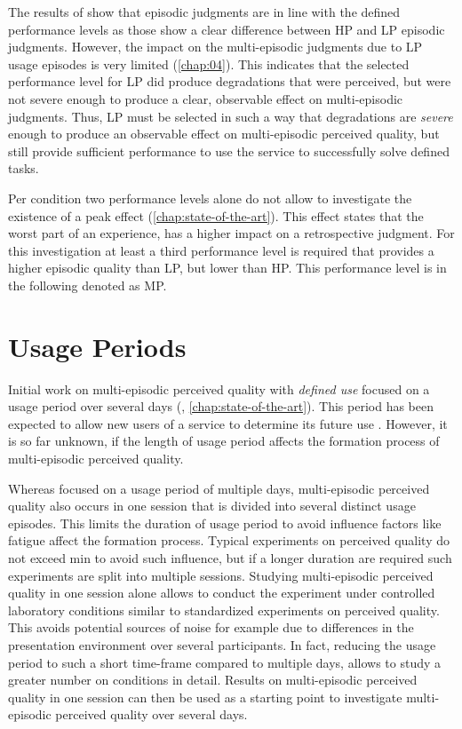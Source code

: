 The results of \cite{moller_single-call_2011} show that episodic judgments are in line with the defined performance levels as those show a clear difference between \ac{HP} and \ac{LP} episodic judgments.
However, the impact on the multi-episodic judgments due to \ac{LP} usage episodes is very limited (\cf \autoref{chap:04}).
This indicates that the selected performance level for \ac{LP} did produce degradations that were perceived, but were not severe enough to produce a clear, observable effect on multi-episodic judgments.
Thus, \ac{LP} must be selected in such a way that degradations are \emph{severe} enough to produce an observable effect on multi-episodic perceived quality, but still provide sufficient performance to use the service to successfully solve defined tasks.

Per condition two performance levels alone do not allow to investigate the existence of a peak effect (\cf \autoref{chap:state-of-the-art}).
This effect states that the worst part of an experience, has a higher impact on a retrospective judgment.
For this investigation at least a third performance level is required that provides a higher episodic quality than \ac{LP}, but lower than \ac{HP}.
This performance level is in the following denoted as \acf{MP}.

\section{Usage Periods}
Initial work on multi-episodic perceived quality with \emph{defined use} focused on a usage period over several days (\cf, \autoref{chap:state-of-the-art}). 
This period has been expected to allow new users of a service to determine its future use \citep[\cf,][]{moller_single-call_2011}.
However, it is so far unknown, if the length of usage period affects the formation process of multi-episodic perceived quality.

Whereas \cite{moller_single-call_2011} focused on a usage period of multiple days, multi-episodic perceived quality also occurs in one session that is divided into several distinct usage episodes.
This limits the duration of usage period to avoid influence factors like fatigue affect the formation process.
Typical experiments on perceived quality do not exceed \unit[90]{min} to avoid such influence, but if a longer duration are required such experiments are split into multiple sessions.
Studying multi-episodic perceived quality in one session alone allows to conduct the experiment under controlled laboratory conditions similar to standardized experiments on perceived quality.
This avoids potential sources of noise for example due to differences in the presentation environment over several participants.
In fact, reducing the usage period to such a short time-frame compared to multiple days, allows to study a greater number on conditions in detail.
Results on multi-episodic perceived quality in one session can then be used as a starting point to investigate multi-episodic perceived quality over several days.


